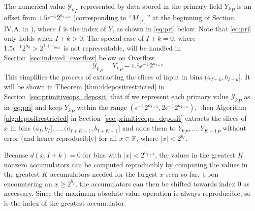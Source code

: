       The numerical value ${\mathcal{Y}_k}_P$ represented by data stored in the
      primary field ${Y_k}_P$ is an offset from $1.5\epsilon^{-1}2^{a_{I + k}}$
      (corresponding to ``$M_{[i]}$'' at the beginning of Section IV.A. in
      \cite{repsum}), where $I$ is the index of $Y$, as shown in
      \eqref{eq:pri} below.
      Note that \eqref{eq:pri} only holds when $I+k > 0$. The special case of $I+k=0$,
      where $1.5\epsilon^{-1}2^{a_0} > 2^{1+e_{max}}$ is not representable,
      will be handled in Section~\ref{sec:indexed_overflow} below on Overflow.
      \begin{equation}
        {\mathcal{Y}_k}_P = {Y_k}_P - 1.5\epsilon^{-1}2^{a_{I + k}}
        \label{eq:pri}
      \end{equation}
      This simplifies the process of extracting the slices of input in bins
      $(a_{I + k}, b_{I + k}]$. It will be shown in Theorem
      \ref{thm:ddepositrestricted} in Section~\ref{sec:primitiveops_deposit}
      that if we represent each primary value ${\mathcal{Y}_k}_P$ as in
      \eqref{eq:pri} and keep ${Y_k}_P$ within the range
      \(
      	(\epsilon^{-1} 2^{a_{I + k}}, 2 \epsilon^{-1} 2^{a_{I + k}}),
      \)
      then Algorithm
      \ref{alg:depositrestricted} in Section~\ref{sec:primitiveops_deposit}
      extracts the slices of $x$ in bins 
      \(
      	(a_I, b_I], \ldots, (a_{I + K - 1}, b_{I + K - 1}]
      \)
      and adds them to ${Y_0}_P, \ldots, {Y_{K - 1}}_P$ without error
      (and hence reproducibly) for all $x \in \mathbb{F}$, where $|x| < 2^{b_I}$.

      Because $d(x, I + k) = 0$ for bins with $|x| < 2^{a_{I + k}}$, the values
      in the greatest $K$ nonzero accumulators can be computed reproducibly by
      computing the values in the greatest $K$ accumulators needed for the
      largest $x$ seen so far. Upon encountering an $x \geq 2^{b_I}$, the
      accumulators can then be shifted towards index $0$ as necessary.  Since
      the maximum absolute value operation is always reproducible, so is the
      index of the greatest accumulator.

